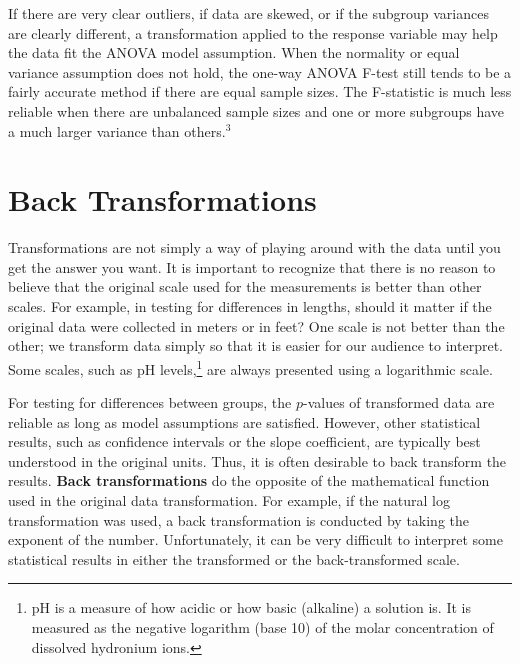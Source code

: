 \documentclass[
]{report}
\begin{document}
\begin{quote}
\begin{enumerate}
\end{enumerate}
\end{quote}

If there are very clear outliers, if data are skewed, or if the subgroup variances are clearly different, a transformation applied to the response variable may help the data fit the ANOVA model assumption. When the normality or equal variance assumption does not hold, the one-way ANOVA F-test still tends to be a fairly accurate method if there are equal sample sizes. The F-statistic is much less reliable when there are unbalanced sample sizes and one or more subgroups have a much larger variance than others.\(^3\)

\hypertarget{back-transformations}{%
\section*{Back Transformations}\label{back-transformations}}

Transformations are not simply a way of playing around with the data until you get the answer you want. It is important to recognize that there is no reason to believe that the original scale used for the measurements is better than other scales. For example, in testing for differences in lengths, should it matter if the original data were collected in meters or in feet? One scale is not better than the other; we transform data simply so that it is easier for our audience to interpret. Some scales, such as pH levels,\footnote{pH is a measure of how acidic or how basic (alkaline) a solution is. It is measured as the negative logarithm (base 10) of the molar concentration of dissolved hydronium ions.} are always presented using a logarithmic scale.

For testing for differences between groups, the \(p\)-values of transformed data are reliable as long as model assumptions are satisfied. However, other statistical results, such as confidence intervals or the slope coefficient, are typically best understood in the original units. Thus, it is often desirable to back transform the results. \textbf{Back transformations} do the opposite of the mathematical function used in the original data transformation. For example, if the natural log transformation was used, a back transformation is conducted by taking the exponent of the number. Unfortunately, it can be very difficult to interpret some statistical results in either the transformed or the back-transformed scale.
\end{document}
